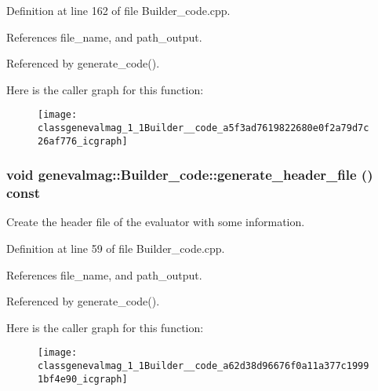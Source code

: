 Definition at line 162 of file Builder\_\-code.cpp.



References file\_\-name, and path\_\-output.



Referenced by generate\_\-code().



Here is the caller graph for this function:\nopagebreak
\begin{figure}[H]
\begin{center}
\leavevmode
\texttt{[image: classgenevalmag\_1\_1Builder\_\_code\_a5f3ad7619822680e0f2a79d7c26af776\_icgraph]}
\end{center}
\end{figure}


\hypertarget{classgenevalmag_1_1Builder__code_a62d38d96676f0a11a377c19991bf4e90}{
\subsubsection[{generate\_\-header\_\-file}]{\setlength{\rightskip}{0pt plus 5cm}void genevalmag::Builder\_\-code::generate\_\-header\_\-file () const}}
\label{classgenevalmag_1_1Builder__code_a62d38d96676f0a11a377c19991bf4e90}
Create the header file of the evaluator with some information. 

Definition at line 59 of file Builder\_\-code.cpp.



References file\_\-name, and path\_\-output.



Referenced by generate\_\-code().



Here is the caller graph for this function:\nopagebreak
\begin{figure}[H]
\begin{center}
\leavevmode
\texttt{[image: classgenevalmag\_1\_1Builder\_\_code\_a62d38d96676f0a11a377c19991bf4e90\_icgraph]}
\end{center}
\end{figure}


